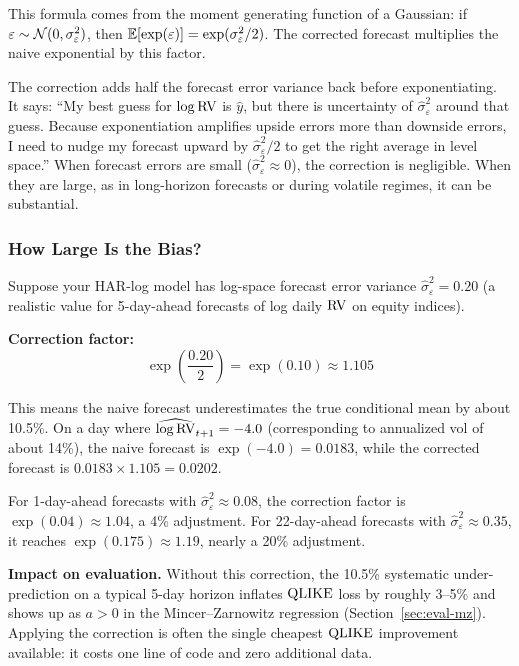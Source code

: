 This formula comes from the moment generating function of a Gaussian: if $\varepsilon \sim \mathcal{N}(0, \sigma^2_\varepsilon)$, then $\mathbb{E}[\exp(\varepsilon)] = \exp(\sigma^2_\varepsilon / 2)$.
The corrected forecast multiplies the naive exponential by this factor.

\begin{intuition}
The correction adds half the forecast error variance back before exponentiating.
It says: ``My best guess for $\log \operatorname{RV}$ is $\hat{y}$, but there is uncertainty of $\hat{\sigma}^2_\varepsilon$ around that guess.
Because exponentiation amplifies upside errors more than downside errors, I need to nudge my forecast upward by $\hat{\sigma}^2_\varepsilon / 2$ to get the right average in level space.''
When forecast errors are small ($\hat{\sigma}^2_\varepsilon \approx 0$), the correction is negligible.
When they are large, as in long-horizon forecasts or during volatile regimes, it can be substantial.
\end{intuition}

\subsubsection{How Large Is the Bias?}

\begin{workedexample}
Suppose your HAR-log model has log-space forecast error variance $\hat{\sigma}^2_\varepsilon = 0.20$ (a realistic value for 5-day-ahead forecasts of log daily $\operatorname{RV}$ on equity indices).

\textbf{Correction factor:}
\[
\exp\!\left(\frac{0.20}{2}\right) = \exp(0.10) \approx 1.105
\]

This means the naive forecast underestimates the true conditional mean by about 10.5\%.
On a day where $\widehat{\log \operatorname{RV}}_{t+1} = -4.0$ (corresponding to annualized vol of about 14\%), the naive forecast is $\exp(-4.0) = 0.0183$, while the corrected forecast is $0.0183 \times 1.105 = 0.0202$.

For 1-day-ahead forecasts with $\hat{\sigma}^2_\varepsilon \approx 0.08$, the correction factor is $\exp(0.04) \approx 1.04$, a 4\% adjustment.
For 22-day-ahead forecasts with $\hat{\sigma}^2_\varepsilon \approx 0.35$, it reaches $\exp(0.175) \approx 1.19$, nearly a 20\% adjustment.

\textbf{Impact on evaluation.}
Without this correction, the 10.5\% systematic under-prediction on a typical 5-day horizon inflates $\operatorname{QLIKE}$ loss by roughly 3--5\% and shows up as $a > 0$ in the Mincer--Zarnowitz regression (Section~\ref{sec:eval-mz}).
Applying the correction is often the single cheapest $\operatorname{QLIKE}$ improvement available: it costs one line of code and zero additional data.
\end{workedexample}

